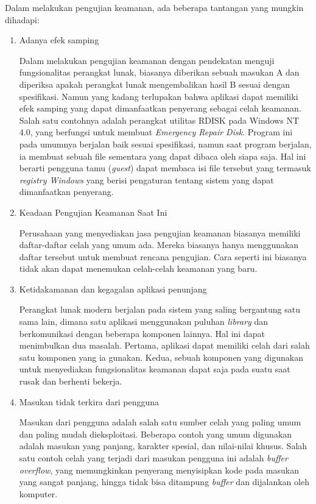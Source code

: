 Dalam melakukan pengujian keamanan, ada beberapa tantangan yang mungkin dihadapi:
\begin{enumerate}
    \item Adanya efek samping
    
    Dalam melakukan pengujian keamanan dengan pendekatan menguji fungsionalitas perangkat lunak,
    biasanya diberikan sebuah masukan A dan diperiksa apakah perangkat lunak mengembalikan
    hasil B sesuai dengan spesifikasi.
    Namun yang kadang terlupakan bahwa aplikasi dapat memiliki efek samping yang dapat dimanfaatkan
    penyerang sebagai celah keamanan. Salah satu contohnya adalah perangkat utilitas 
    RDISK pada Windows NT 4.0,  yang berfungsi untuk membuat \emph{Emergency Repair Disk}.
    Program ini pada umumnya berjalan baik sesuai spesifikasi, namun saat program berjalan,
    ia membuat sebuah file sementara yang dapat dibaca oleh siapa saja.
    Hal ini berarti pengguna tamu (\emph{guest}) dapat membaca isi file tersebut yang
    termasuk \emph{registry Windows} yang berisi pengaturan tentang sistem yang dapat dimanfaatkan penyerang.

    \item Keadaan Pengujian Keamanan Saat Ini

    Perusahaan yang menyediakan jasa pengujian keamanan biasanya memiliki daftar-daftar celah yang umum ada.
    Mereka biasanya hanya menggunakan daftar tersebut untuk membuat rencana pengujian.
    Cara seperti ini biasanya tidak akan dapat menemukan celah-celah keamanan yang baru.

    \item Ketidakamanan dan kegagalan aplikasi penunjang

    Perangkat lunak modern berjalan pada sistem yang saling bergantung satu sama lain,
    dimana satu aplikasi menggunakan puluhan \emph{library} dan berkomunikasi dengan
    beberapa komponen lainnya.
    Hal ini dapat menimbulkan dua masalah.
    Pertama, aplikasi dapat memiliki celah dari salah satu komponen yang ia gunakan.
    Kedua, sebuah komponen yang digunakan untuk menyediakan fungsionalitas keamanan
    dapat saja pada suatu saat rusak dan berhenti bekerja.

    \item Masukan tidak terkira dari pengguna

    Masukan dari pengguna adalah salah satu sumber celah yang paling umum dan paling mudah dieksploitasi.
    Beberapa contoh yang umum digunakan adalah masukan yang panjang, karakter spesial, dan nilai-nilai khusus.
    Salah satu contoh celah yang terjadi dari masukan pengguna ini adalah \emph{buffer overflow},
    yang memungkinkan penyerang menyisipkan kode pada masukan yang sangat panjang,
    hingga tidak bisa ditampung \emph{buffer} dan dijalankan oleh komputer. 


\end{enumerate}
